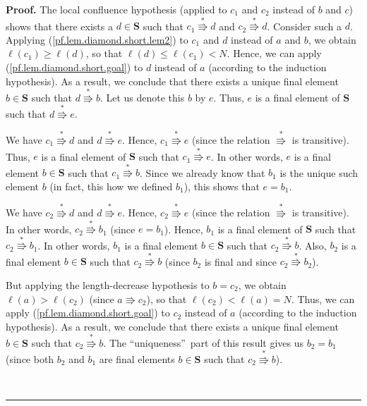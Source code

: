 \documentclass[numbers=enddot,12pt,final,onecolumn,notitlepage]{scrartcl}%
\theoremstyle{definition}
\newenvironment{proof}[1][Proof]{\noindent\textbf{#1.} }{\ \rule{0.5em}{0.5em}}
\newenvironment{vershort}{}{}
\begin{document}
\begin{vershort}
\begin{proof}
The local confluence hypothesis (applied to $c_{1}$ and $c_{2}$ instead of $b$
and $c$) shows that there exists a $d\in\mathbf{S}$ such that $c_{1}%
\overset{\ast}{\Rrightarrow}d$ and $c_{2}\overset{\ast}{\Rrightarrow}d$.
Consider such a $d$. Applying (\ref{pf.lem.diamond.short.lem2}) to $c_{1}$ and
$d$ instead of $a$ and $b$, we obtain $\ell\left(  c_{1}\right)  \geq
\ell\left(  d\right)  $, so that $\ell\left(  d\right)  \leq\ell\left(
c_{1}\right)  <N$. Hence, we can apply (\ref{pf.lem.diamond.short.goal}) to
$d$ instead of $a$ (according to the induction hypothesis). As a result, we
conclude that there exists a unique final element $b\in\mathbf{S}$ such that
$d\overset{\ast}{\Rrightarrow}b$. Let us denote this $b$ by $e$. Thus, $e$ is
a final element of $\mathbf{S}$ such that $d\overset{\ast}{\Rrightarrow}e$.

We have $c_{1}\overset{\ast}{\Rrightarrow}d$ and $d\overset{\ast
}{\Rrightarrow}e$. Hence, $c_{1}\overset{\ast}{\Rrightarrow}e$ (since the
relation $\overset{\ast}{\Rrightarrow}$ is transitive). Thus, $e$ is a final
element of $\mathbf{S}$ such that $c_{1}\overset{\ast}{\Rrightarrow}e$. In
other words, $e$ is a final element $b\in\mathbf{S}$ such that $c_{1}%
\overset{\ast}{\Rrightarrow}b$. Since we already know that $b_{1}$ is the
unique such element $b$ (in fact, this how we defined $b_{1}$), this shows
that $e=b_{1}$.

We have $c_{2}\overset{\ast}{\Rrightarrow}d$ and $d\overset{\ast
}{\Rrightarrow}e$. Hence, $c_{2}\overset{\ast}{\Rrightarrow}e$ (since the
relation $\overset{\ast}{\Rrightarrow}$ is transitive). In other words,
$c_{2}\overset{\ast}{\Rrightarrow}b_{1}$ (since $e=b_{1}$). Hence, $b_{1}$ is
a final element of $\mathbf{S}$ such that $c_{2}\overset{\ast}{\Rrightarrow
}b_{1}$. In other words, $b_{1}$ is a final element $b\in\mathbf{S}$ such that
$c_{2}\overset{\ast}{\Rrightarrow}b$. Also, $b_{2}$ is a final element
$b\in\mathbf{S}$ such that $c_{2}\overset{\ast}{\Rrightarrow}b$ (since $b_{2}$
is final and since $c_{2}\overset{\ast}{\Rrightarrow}b_{2}$).

But applying the length-decrease hypothesis to $b=c_{2}$, we obtain
$\ell\left(  a\right)  >\ell\left(  c_{2}\right)  $ (since $a\Rrightarrow
c_{2}$), so that $\ell\left(  c_{2}\right)  <\ell\left(  a\right)  =N$. Thus,
we can apply (\ref{pf.lem.diamond.short.goal}) to $c_{2}$ instead of $a$
(according to the induction hypothesis). As a result, we conclude that there
exists a unique final element $b\in\mathbf{S}$ such that $c_{2}\overset{\ast
}{\Rrightarrow}b$. The \textquotedblleft uniqueness\textquotedblright\ part of
this result gives us $b_{2}=b_{1}$ (since both $b_{2}$ and $b_{1}$ are final
elements $b\in\mathbf{S}$ such that $c_{2}\overset{\ast}{\Rrightarrow}b$).


\end{proof}
\end{vershort}
\end{document}
